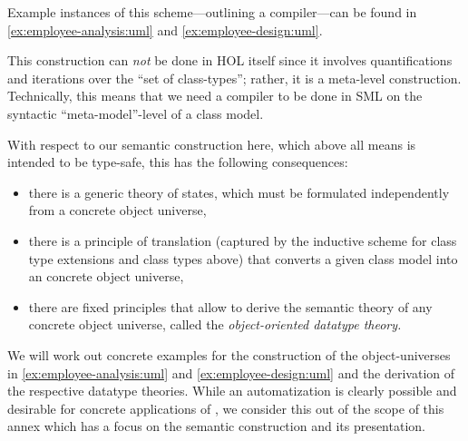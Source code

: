 Example instances of this scheme---outlining a compiler---can be found
in \autoref{ex:employee-analysis:uml} and \autoref{ex:employee-design:uml}.

This construction can \emph{not} be done in HOL itself since it
involves quantifications and iterations over the ``set of class-types'';
rather, it is a meta-level construction.  Technically, this means that
we need a compiler to be done in SML on the syntactic
``meta-model''-level of a class model.

With respect to our semantic construction here,
which above all means is intended to be type-safe, this has the following consequences:
\begin{itemize}
\item there is a generic theory of states, which must be formulated independently
      from a concrete object universe,
\item there is a principle of translation (captured by the inductive scheme for
      class type extensions and class types above) that converts a given class model
      into an concrete object universe,
\item there are fixed principles that allow to derive the semantic theory of any
      concrete object universe, called the \emph{object-oriented datatype theory.}
\end{itemize}
We will work out concrete examples for the construction of the
object-universes in \autoref{ex:employee-analysis:uml} and \autoref{ex:employee-design:uml} and the
derivation of the respective datatype theories. While an
automatization is clearly possible and desirable for concrete
applications of  \FOCL, we consider this out of the scope
of this annex which has a focus on the semantic construction and its
presentation.


